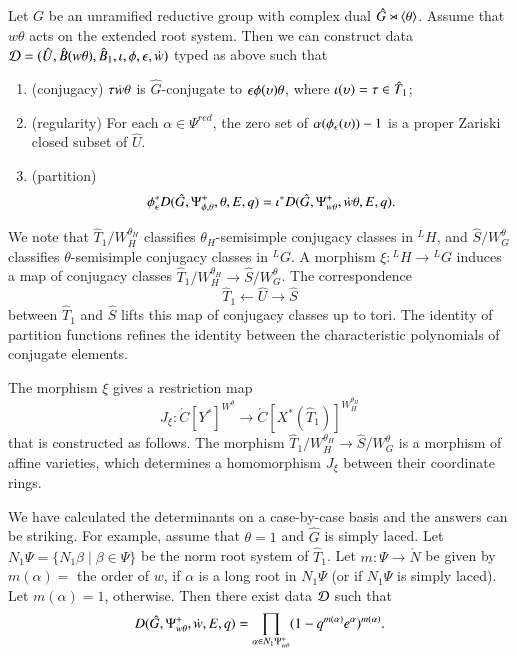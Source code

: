 \begin{proposition}\label{lemma:ephi}
  Let $G$ be an unramified reductive group with complex dual $\hat
  G\rtimes \langle{\theta}\rangle$.  Assume that $w\theta$ acts on the extended
  root system.  Then we can construct data $\mathcal D=(\hat U,\hat
  B(w\theta),\hat B_1,\iota,\phi,\epsilon,\dot w)$ typed as above such
  that
\begin{enumerate}
\item (conjugacy) $\tau\dot w\theta$ is $\hat G$-conjugate to
  $\epsilon\phi(\upsilon) \theta$, where $\iota(\upsilon) = \tau\in\hat T_1$;
\item (regularity) For each $\alpha\in\Psi^{red}$, the zero set of
  $\alpha(\phi_\epsilon(\upsilon))-1$ is a proper Zariski closed subset of
  $\hat U$.
\item (partition) 
\[
\phi^*_\epsilon D(\hat G,\Psi_{\phi,\theta}^+,\theta,E,q) =
\iota^* D(\hat G,\Psi_{w\theta}^+,\dot w\theta,E,q).
\]
\end{enumerate}
\end{proposition}

\begin{remark}
  We note that $\hat T_1/W_H^{\theta_H}$ classifies
  $\theta_H$-semisimple conjugacy classes in ${}^LH$, and $\hat
  S/W_G^{\theta}$ classifies $\theta$-semisimple conjugacy classes in
  ${}^LG$.  A morphism $\xi:{}^LH\to {}^LG$ induces a map of conjugacy
  classes $\hat T_1/W_H^{\theta_H}\to \hat S/W_G^\theta$.  The
  correspondence
\[
\hat T_1 \longleftarrow \hat U \longrightarrow \hat S
\]
between $\hat T_1$ and $\hat S$ lifts this map of conjugacy classes up
to tori.  The identity of partition functions refines the identity
between the characteristic polynomials of conjugate elements.

The morphism $\xi$ gives a restriction map
\begin{equation}\label{eqn:Jxi}
J_\xi:\ring{C}[Y^*]^{W^\theta} \to \ring{C}[X^*(\hat T_1)]^{W_H^{\theta_H}}
\end{equation}
that is constructed as follows.  The morphism $\hat
T_1/W_H^{\theta_H}\to \hat S/W_G^\theta$ is a morphism of affine
varieties, which determines a homomorphism $J_\xi$ between their
coordinate rings.
\end{remark}


\begin{remark}
  We have calculated the determinants on a case-by-case basis and the
  answers can be striking.  For example, assume that $\theta=1$ and
  $\hat G$ is simply laced.  Let
  $N_1\Psi=\{N_1\beta\mid \beta\in \Psi\}$ be the norm root system of
  $\hat T_1$.  Let $m:\Psi\to \ring{N}$ be given by $m(\alpha)=$ the
  order of $w$, if $\alpha$ is a long root in $N_1\Psi$ (or if
  $N_1\Psi$ is simply laced).  Let $m(\alpha) = 1$, otherwise.  Then
  there exist data $\mathcal D$ such that
\begin{equation}\label{eqn:laced0}
D(\hat G,\Psi_{w\theta}^+,\dot w,E,q) 
= \prod_{\alpha\in N_1\Psi_{w\theta}^{+}} 
(1- q^{m(\alpha)} e^\alpha)^{m(\alpha)}.
\end{equation}
\end{remark}

